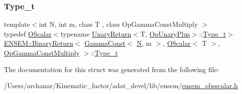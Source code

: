 \subsubsection{\texorpdfstring{Type\_t}{Type\_t}\hspace{0.1cm}{\footnotesize\ttfamily [2/2]}}
{\footnotesize\ttfamily template$<$int N, int m, class T , class Op\+Gamma\+Const\+Multiply $>$ \\
typedef \mbox{\hyperlink{classENSEM_1_1OScalar}{O\+Scalar}}$<$typename \mbox{\hyperlink{structENSEM_1_1UnaryReturn}{Unary\+Return}}$<$T, \mbox{\hyperlink{structENSEM_1_1OpUnaryPlus}{Op\+Unary\+Plus}}$>$\+::\mbox{\hyperlink{structENSEM_1_1BinaryReturn_3_01GammaConst_3_01N_00_01m_01_4_00_01OScalar_3_01T_01_4_00_01OpGammaConstMultiply_01_4_a193fb1b8c8ec58063f879ac03885c163}{Type\+\_\+t}}$>$ \mbox{\hyperlink{structENSEM_1_1BinaryReturn}{E\+N\+S\+E\+M\+::\+Binary\+Return}}$<$ \mbox{\hyperlink{classENSEM_1_1GammaConst}{Gamma\+Const}}$<$ \mbox{\hyperlink{operator__name__util_8cc_a7722c8ecbb62d99aee7ce68b1752f337}{N}}, m $>$, \mbox{\hyperlink{classENSEM_1_1OScalar}{O\+Scalar}}$<$ T $>$, \mbox{\hyperlink{structENSEM_1_1OpGammaConstMultiply}{Op\+Gamma\+Const\+Multiply}} $>$\+::\mbox{\hyperlink{structENSEM_1_1BinaryReturn_3_01GammaConst_3_01N_00_01m_01_4_00_01OScalar_3_01T_01_4_00_01OpGammaConstMultiply_01_4_a193fb1b8c8ec58063f879ac03885c163}{Type\+\_\+t}}}



The documentation for this struct was generated from the following file\+:\begin{DoxyCompactItemize}
\item 
/\+Users/archanar/\+Kinematic\+\_\+factor/adat\+\_\+devel/lib/ensem/\mbox{\hyperlink{lib_2ensem_2ensem__obsscalar_8h}{ensem\+\_\+obsscalar.\+h}}\end{DoxyCompactItemize}
